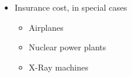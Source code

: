 \begin{enumerate}[noitemsep]
\begin{itemize}[noitemsep]
  \item Insurance cost, in special cases
    \begin{itemize}[noitemsep]
    \item Airplanes
    \item Nuclear power plants
    \item X-Ray machines
    \end{itemize}
  \end{itemize}
\end{enumerate}

